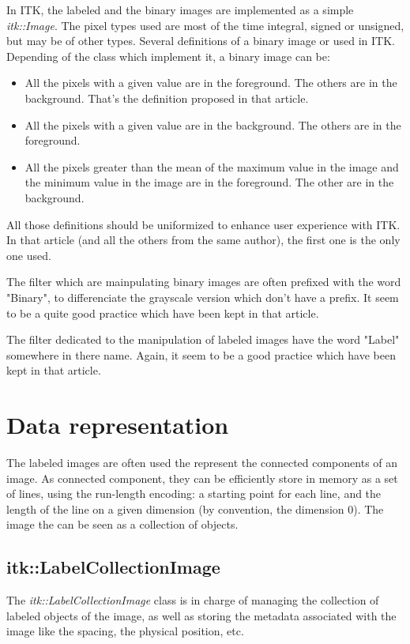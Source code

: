 \documentclass{InsightArticle}
\begin{document}
In ITK, the labeled and the binary images are implemented as a simple {\em
itk::Image}. The pixel types used are most of the time integral, signed or
unsigned, but may be of other types.
Several definitions of a binary image or used in ITK. Depending of the class
which implement it, a binary image can be:
\begin{itemize}
  \item All the pixels with a given value are in the foreground. The others are
in the background. That's the definition proposed in that article.
  \item All the pixels with a given value are in the background. The others are
in the foreground.
  \item All the pixels greater than the mean of the maximum value in the image
and the minimum value in the image are in the foreground. The other are in the
background.
\end{itemize}
All those definitions should be uniformized to enhance user experience with ITK.
In that article (and all the others from the same author), the first one is the
only one used.

The filter which are mainpulating binary images are often prefixed with the word
"Binary", to differenciate the grayscale version which don't have a prefix. It
seem to be a quite good practice which have been kept in that article.

The filter dedicated to the manipulation of labeled images have the word "Label"
somewhere in there name. Again, it seem to be a good practice which have been
kept in that article.


\section{Data representation}

The labeled images are often used the represent the connected components of an
image. As connected component, they can be efficiently store in memory as a set
of lines, using the run-length encoding: a starting point for each line, and the
length of the line on a given dimension (by convention, the dimension 0). The
image the can be seen as a collection of objects.

\subsection{itk::LabelCollectionImage}

The {\em itk::LabelCollectionImage} class is in charge of managing the
collection of labeled
objects of the image, as well as storing the metadata associated with the image
like
the spacing, the physical position, etc.
\end{document}
